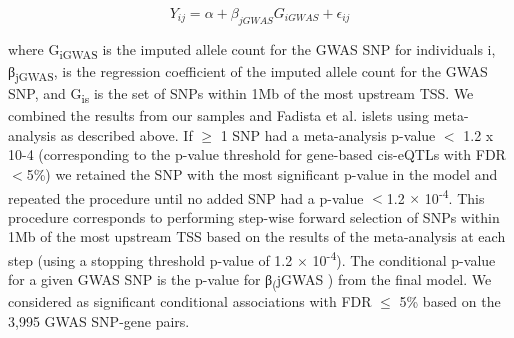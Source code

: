 \[Y_{ij} = \alpha + \beta_{jGWAS}G_{iGWAS} + \epsilon_{ij} \]


where G\textsubscript{iGWAS} is the imputed allele count for the GWAS SNP for individuals i, β\textsubscript{jGWAS}, is the regression coefficient of the imputed allele count for the GWAS SNP, and G\textsubscript{is} is the set of SNPs within 1Mb of the most upstream TSS. We combined the results from our samples and Fadista et al. islets using meta-analysis as described above.  If $\geq$ 1 SNP had a meta-analysis p-value $<$ 1.2 x 10-4 (corresponding to the p-value threshold for gene-based cis-eQTLs with FDR $<$5\%) we retained the SNP with the most significant p-value in the model and repeated the procedure until no added SNP had a p-value $<$1.2 $\times$ 10\textsuperscript{-4}. This procedure corresponds to performing step-wise forward selection of SNPs within 1Mb of the most upstream TSS based on the results of the meta-analysis at each step (using a stopping threshold p-value of 1.2 $\times$ 10\textsuperscript{-4}). The conditional p-value for a given GWAS SNP is the p-value for β\textsubscript(jGWAS ) from the final model. We considered as significant conditional associations with FDR $\leq$ 5\% based on the 3,995 GWAS SNP-gene pairs.

